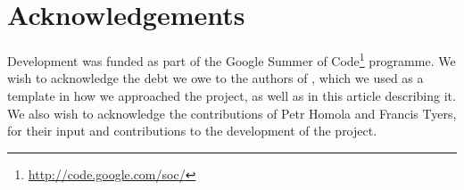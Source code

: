 \documentclass[11pt]{article}
\begin{document}
\section{Acknowledgements}

Development was funded as part of the Google Summer of Code\footnote{\url{http://code.google.com/soc/}} 
programme. 
We wish to acknowledge the debt we owe to the authors of \cite{tyers2009rfr}, which 
we used as a template in how we approached the project, as well as in this article
describing it.
We also wish to acknowledge the contributions of Petr Homola and Francis Tyers, for their
input and contributions to the development of the project.



\end{document}
